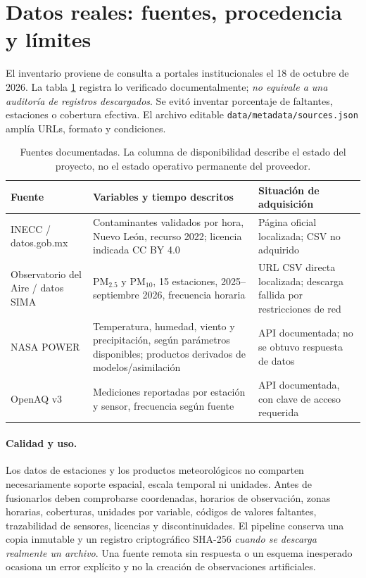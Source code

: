 \section{Datos reales: fuentes, procedencia y límites}\label{sec:datos}
El inventario proviene de consulta a portales institucionales el 18 de octubre de 2026. La tabla \ref{tab:fuentes} registra lo verificado documentalmente; \emph{no equivale a una auditoría de registros descargados}. Se evitó inventar porcentaje de faltantes, estaciones o cobertura efectiva. El archivo editable \texttt{data/metadata/sources.json} amplía URLs, formato y condiciones.

\begin{table}[H]\centering\small\caption{Fuentes documentadas. La columna de disponibilidad describe el estado del proyecto, no el estado operativo permanente del proveedor.}\label{tab:fuentes}
\begin{tabular}{p{.23\linewidth}p{.38\linewidth}p{.28\linewidth}}\toprule
Fuente & Variables y tiempo descritos & Situación de adquisición\\\midrule
INECC / datos.gob.mx & Contaminantes validados por hora, Nuevo León, recurso 2022; licencia indicada CC BY 4.0 & Página oficial localizada; CSV no adquirido \\
Observatorio del Aire / datos SIMA & PM$_{2.5}$ y PM$_{10}$, 15 estaciones, 2025--septiembre 2026, frecuencia horaria & URL CSV directa localizada; descarga fallida por restricciones de red \\
NASA POWER & Temperatura, humedad, viento y precipitación, según parámetros disponibles; productos derivados de modelos/asimilación & API documentada; no se obtuvo respuesta de datos \\
OpenAQ v3 & Mediciones reportadas por estación y sensor, frecuencia según fuente & API documentada, con clave de acceso requerida \\
\bottomrule\end{tabular}
\end{table}

\paragraph{Calidad y uso.} Los datos de estaciones y los productos meteorológicos no comparten necesariamente soporte espacial, escala temporal ni unidades. Antes de fusionarlos deben comprobarse coordenadas, horarios de observación, zonas horarias, coberturas, unidades por variable, códigos de valores faltantes, trazabilidad de sensores, licencias y discontinuidades. El pipeline conserva una copia inmutable y un registro criptográfico SHA-256 \emph{cuando se descarga realmente un archivo}. Una fuente remota sin respuesta o un esquema inesperado ocasiona un error explícito y no la creación de observaciones artificiales.

